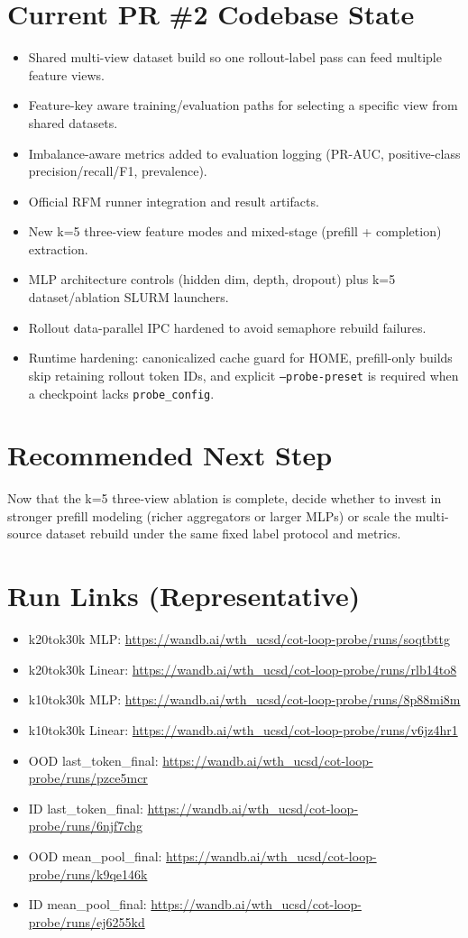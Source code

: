 \documentclass[11pt]{article}
\begin{document}
\section*{Current PR \#2 Codebase State}
\begin{itemize}
  \item Shared multi-view dataset build so one rollout-label pass can feed multiple feature views.
  \item Feature-key aware training/evaluation paths for selecting a specific view from shared datasets.
  \item Imbalance-aware metrics added to evaluation logging (PR-AUC, positive-class precision/recall/F1, prevalence).
  \item Official RFM runner integration and result artifacts.
  \item New k=5 three-view feature modes and mixed-stage (prefill + completion) extraction.
  \item MLP architecture controls (hidden dim, depth, dropout) plus k=5 dataset/ablation SLURM launchers.
  \item Rollout data-parallel IPC hardened to avoid semaphore rebuild failures.
  \item Runtime hardening: canonicalized cache guard for HOME, prefill-only builds skip retaining rollout token IDs, and explicit \texttt{--probe-preset} is required when a checkpoint lacks \texttt{probe\_config}.
\end{itemize}

\section*{Recommended Next Step}
Now that the k=5 three-view ablation is complete, decide whether to invest in stronger prefill modeling (richer aggregators or larger MLPs) or scale the multi-source dataset rebuild under the same fixed label protocol and metrics.

\section*{Run Links (Representative)}
\begin{itemize}
  \item k20tok30k MLP: \url{https://wandb.ai/wth_ucsd/cot-loop-probe/runs/soqtbttg}
  \item k20tok30k Linear: \url{https://wandb.ai/wth_ucsd/cot-loop-probe/runs/rlb14to8}
  \item k10tok30k MLP: \url{https://wandb.ai/wth_ucsd/cot-loop-probe/runs/8p88mi8m}
  \item k10tok30k Linear: \url{https://wandb.ai/wth_ucsd/cot-loop-probe/runs/v6jz4hr1}
  \item OOD last\_token\_final: \url{https://wandb.ai/wth_ucsd/cot-loop-probe/runs/pzce5mcr}
  \item ID last\_token\_final: \url{https://wandb.ai/wth_ucsd/cot-loop-probe/runs/6njf7chg}
  \item OOD mean\_pool\_final: \url{https://wandb.ai/wth_ucsd/cot-loop-probe/runs/k9qe146k}
  \item ID mean\_pool\_final: \url{https://wandb.ai/wth_ucsd/cot-loop-probe/runs/ej6255kd}
\end{itemize}
\end{document}
